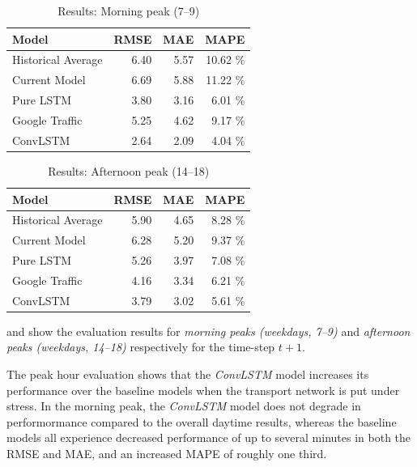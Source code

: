 ﻿\documentclass[preprint,11pt,5p,twocolumn]{elsarticle}
\begin{document}
\begin{table}[!ht]
  \center
  \begin{tabular}{l|rrr}
  Model &  RMSE &  MAE &  MAPE \\
  \hline
  \hline
  Historical Average &        6.40 &       5.57 &     10.62 \% \\ \hline
  Current Model      &        6.69 &       5.88 &     11.22 \% \\ \hline
  Pure LSTM          &        3.80 &       3.16 &      6.01 \% \\ \hline
  Google Traffic     &        5.25 &       4.62 &      9.17 \% \\ \hline
  ConvLSTM           &        2.64 &       2.09 &      4.04 \% \\ \hline
  \end{tabular}
  \caption{Results: Morning peak (7--9)}
  \label{tab:morning_peak}
  
\end{table}

\begin{table}[!ht]
  \center
  \begin{tabular}{l|rrr}
  Model &  RMSE &  MAE &  MAPE \\
  \hline
  \hline
  Historical Average &    5.90 &   4.65 &  8.28 \% \\ \hline
  Current Model      &    6.28 &   5.20 &  9.37 \% \\ \hline
  Pure LSTM          &    5.26 &       3.97 &      7.08 \% \\ \hline
  Google Traffic     &    4.16 &   3.34 &  6.21 \% \\ \hline
  ConvLSTM           &    3.79 &   3.02 &  5.61 \% \\ \hline
  \end{tabular}
  \caption{Results: Afternoon peak (14--18)}
  \label{tab:afternoon_peak}  
\end{table}

 and  show the evaluation results for \emph{morning peaks (weekdays, 7--9)} and \emph{afternoon peaks (weekdays, 14--18)} respectively for the time-step $t + 1$.

The peak hour evaluation shows that the \emph{ConvLSTM} model increases its performance over the baseline models when the transport network is put under stress. In the morning peak, the \emph{ConvLSTM} model does not degrade in performormance compared to the overall daytime results, whereas the baseline models all experience decreased performance of up to several minutes in both the RMSE and MAE, and an increased MAPE of roughly one third. 
\end{document}

